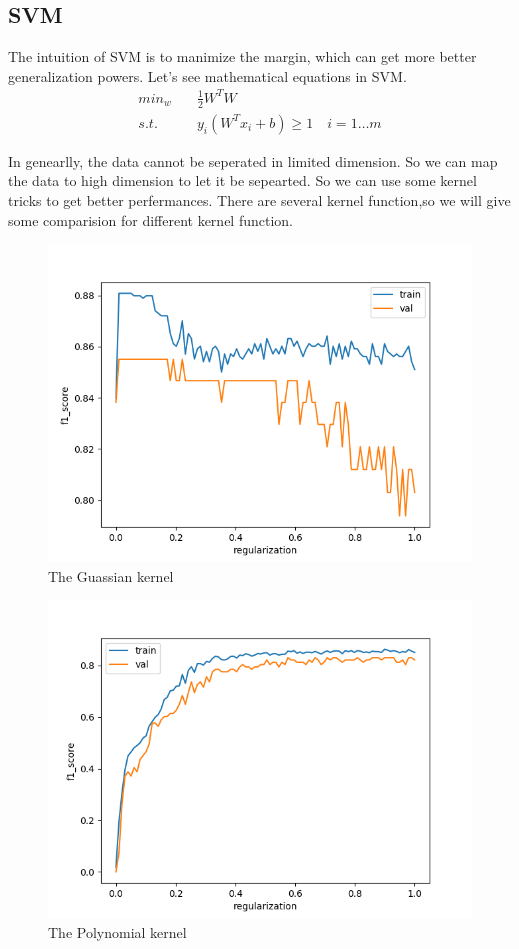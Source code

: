 \subsection{SVM}
The intuition of SVM\cite{SVM} is to manimize the margin, which can get more better generalization powers. Let's see mathematical equations in SVM.
\begin{align}
    min_w & \quad \frac{1}{2} W^TW \\
    s.t. &\quad y_i(W^T x_i+b) \geq 1  \quad i = 1\dots m
\end{align}

In genearlly, the data cannot be seperated in limited dimension. So we can map the data to high dimension to let it be sepearted. So we can use some kernel tricks to get better perfermances. There are several kernel function,so we will give some comparision for different kernel function.
\begin{figure}[ht]
    \centering
    \includegraphics[width=1\linewidth]{img/f1_score_bs1_svm_rbf_smote.png}
    \caption{The Guassian kernel}
\end{figure}

\begin{figure}[ht]
    \centering
    \includegraphics[width=1\linewidth]{img/f1_score_bs1_svm_poly_smote.png}
    \caption{The Polynomial kernel}
\end{figure}

